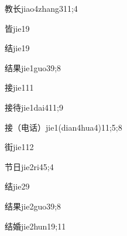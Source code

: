 \begin{verbete}{教长}{jiao4zhang3}{11;4}
\end{verbete}

\begin{verbete}{皆}{jie1}{9}
\end{verbete}

\begin{verbete}{结}{jie1}{9}
\end{verbete}

\begin{verbete}{结果}{jie1guo3}{9;8}
\end{verbete}

\begin{verbete}{接}{jie1}{11}
\end{verbete}

\begin{verbete}{接待}{jie1dai4}{11;9}
\end{verbete}

\begin{verbete}{接（电话）}{jie1(dian4hua4)}{11;5;8}
\end{verbete}

\begin{verbete}{街}{jie1}{12}
\end{verbete}

\begin{verbete}{节日}{jie2ri4}{5;4}
\end{verbete}

\begin{verbete}{结}{jie2}{9}
\end{verbete}

\begin{verbete}{结果}{jie2guo3}{9;8}
\end{verbete}

\begin{verbete}{结婚}{jie2hun1}{9;11}
\end{verbete}

